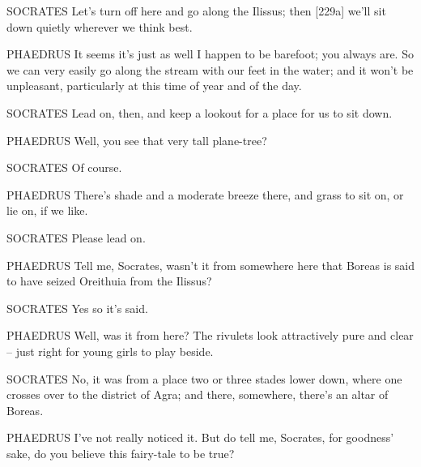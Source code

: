 SOCRATES Let's turn off here and go along the
Ilissus; then {[}229a{]}
we'll sit down quietly wherever we think best.

PHAEDRUS It seems it's just as well I happen to be barefoot; you always
are. So we can very easily go along the stream with  our feet in
the water; and it won't be unpleasant, particularly at this time of year
and of the day.

SOCRATES Lead on, then, and keep a lookout for a place for us to sit
down.

PHAEDRUS Well, you see that very tall plane-tree?

SOCRATES Of course.

PHAEDRUS There's shade and a moderate breeze there, and  grass
to sit on, or lie on, if we like.

SOCRATES Please lead on.

PHAEDRUS Tell me, Socrates, wasn't it from somewhere here that Boreas is
said to have seized
Oreithuia from the
Ilissus? 

SOCRATES Yes so it's said.

PHAEDRUS Well, was it from here? The rivulets look attractively pure and
clear -- just right for young girls to play beside.

SOCRATES No, it was from a place two or three stades lower 
down, where one crosses over to the district of
Agra; and there,
somewhere, there's an altar of Boreas.

PHAEDRUS I've not really noticed it. But do tell me, Socrates, 
for goodness' sake, do
you believe this fairy-tale to be true?

